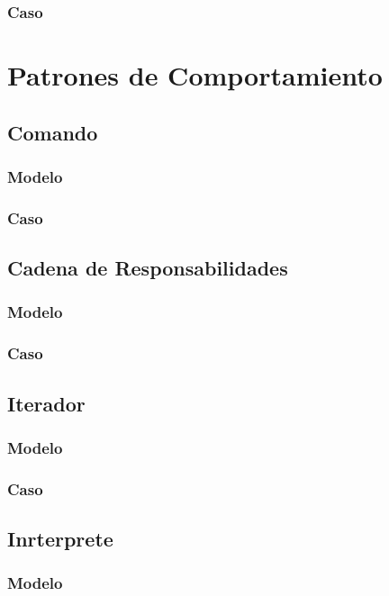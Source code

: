 \subsubsection{Caso}
\newpage

\section{Patrones de Comportamiento}

\subsection{Comando}
\subsubsection{Modelo}
\newpage
\subsubsection{Caso}
\newpage

\subsection{Cadena de Responsabilidades}
\subsubsection{Modelo}
\newpage
\subsubsection{Caso}
\newpage

\subsection{Iterador}
\subsubsection{Modelo}
\newpage
\subsubsection{Caso}
\newpage

\subsection{Inrterprete}
\subsubsection{Modelo}
\newpage
